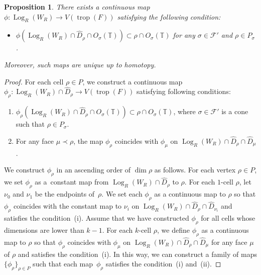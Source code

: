 \documentclass[pdftex]{sigma}
\numberwithin{equation}{section}
\newtheorem{Proposition}[Theorem]{Proposition}
 { \theoremstyle{definition}
\newtheorem{Definition}[Theorem]{Definition}
\newtheorem{Example}[Theorem]{Example} }
\begin{document}
\begin{Proposition}\label{pr:phi} There exists a continuous map $\phi \colon \operatorname{Log}_R(W_R) \to V(\operatorname{trop}(F))$ satisfying the following condition:
\begin{itemize}\itemsep=0pt
 \item[$(\ast)$] $\phi(\operatorname{Log}_R(W_R) \cap \widehat{D}_{\rho} \cap O_\sigma({\mathbb T})) \subset \rho \cap O_\sigma({\mathbb T})$ for any $\sigma \in {\mathcal F}'$ and $\rho \in P_\sigma$.
\end{itemize}
Moreover, such maps are unique up to homotopy.
\end{Proposition}
\begin{proof}
For each cell $\rho \in P$, we construct a continuous map $\phi_\rho \colon \operatorname{Log}_R(W_R) \cap \widehat{D}_{\rho} \to V(\operatorname{trop}(F))$ satisfying following conditions:
\begin{enumerate}\itemsep=0pt
\item[(i)] $\phi_{\rho}(\operatorname{Log}_R(W_R) \cap \widehat{D}_\rho \cap O_\sigma({\mathbb T})) \subset \rho \cap O_\sigma({\mathbb T})$, where $\sigma \in {\mathcal F}'$ is a cone such that $\rho \in P_\sigma$. %
\item[(ii)] For any face $\mu \prec \rho$, the map $\phi_\rho$ coincides with $\phi_\mu$ on $\operatorname{Log}_R(W_R) \cap \widehat{D}_\rho \cap \widehat{D}_\mu$. %
\end{enumerate}
We construct $\phi_\rho$ in an ascending order of $\dim \rho$ as follows. For each vertex $\rho \in P$, we set $\phi_\rho$ as a~constant map from $\operatorname{Log}_R(W_R) \cap \widehat{D}_\rho$ to $\rho$. For each $1$-cell $\rho$, let $\nu_0$ and $\nu_1$ be the endpoints of~$\rho$. We set each $\phi_\rho$ as a continuous map to $\rho$ so that $\phi_\rho$ coincides with the constant map to $\nu_i$ on $\operatorname{Log}_R(W_R) \cap \widehat{D}_\rho \cap \widehat{D}_{\nu_i}$ and satisf\/ies the condition~(i). Assume that we have constructed $\phi_\rho$ for all cells whose dimensions are lower than $k-1$. For each $k$-cell $\rho$, we def\/ine $\phi_\rho$ as a continuous map to $\rho$ so that $\phi_\rho$ coincides with $\phi_\mu$ on $\operatorname{Log}_R(W_R) \cap \widehat{D}_\rho \cap \widehat{D}_{\mu}$ for any face $\mu$ of $\rho$ and satisf\/ies the condition~(i). In this way, we can construct a family of maps $\{\phi_\rho\}_{\rho \in P}$ such that each map~$\phi_\rho$ satisf\/ies the condition~(i) and~(ii).


\end{proof}
\end{document}
